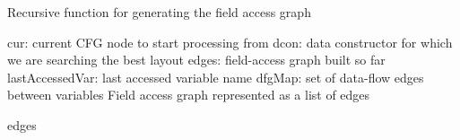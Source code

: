 \documentclass[acmsmall,review,anonymous]{acmart}\settopmatter{printfolios=true,printccs=false,printacmref=false}
\begin{document}
\begin{algorithm}[t]
        \caption{Recursive function for generating the field access graph}\label{alg:field-access-graph}
        \begin{algorithmic}[1]
            \small
            \Input
                \State cur: current CFG node to start processing from
                \State dcon: data constructor for which we are searching the best layout
                \State edges: field-access graph built so far
                \State lastAccessedVar: last accessed variable name
                \State dfgMap: set of data-flow edges between variables
            \EndInput
            \Output
                \State Field access graph represented as a list of edges
\EndOutput

                 \label{line-likelihood-example}
                 \label{line:lastAccessedVar-start}
                     \label{line:boundInDcon}
						\Continue
					\EndIf
							  \label{line:cfg-edge}
                                  \label{line:dfg-edge}
                            \EndIf
\EndIf
                \EndFor \label{line:lastAccessedVar-end}
                
                 \label{line:succ-rec-start}
                \EndFor \label{line:succ-rec-end}

                \State \Return edges\textquotesingle

            \EndFunction





\end{algorithmic}
    \end{algorithm}
\end{document}
